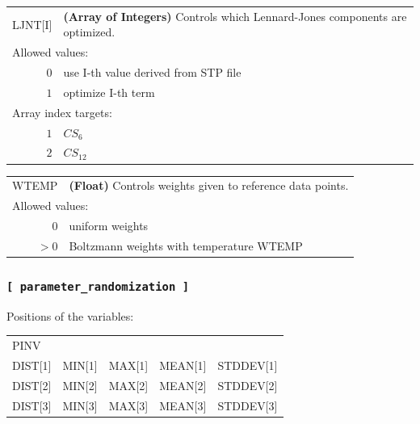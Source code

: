 \documentclass[10pt,a4paper,openany]{memoir}
\numberwithin{equation}{section}
\begin{document}
{
\begin{tabular}{r@{ : }l}
\label{descr:ljnt}
      LJNT[I]&\textbf{(Array of Integers)} Controls which Lennard-Jones components are optimized.                                               \\ 
\multicolumn{2}{l}{Allowed values:} \\ 
     \(0\)&use I-th value derived from STP file                                                                         \\ 
     \(1\)&optimize I-th term                                                                                   \\ 
\multicolumn{2}{l}{Array index targets:} \\ 
     \(1\)&$CS_6$                                                                                 \\ 
     \(2\)&$CS_{12}$                                                                            \\ 
\end{tabular}
\vspace{1ex}
}

{
\begin{tabular}{r@{ : }l}
\label{descr:wtemp}
     WTEMP&\textbf{(Float)} Controls weights given to reference data points.                                                     \\ 
\multicolumn{2}{l}{Allowed values:} \\ 
     \(0\)&uniform weights                                                                                      \\ 
    \(>0\)&Boltzmann weights with temperature WTEMP                                                             \\ 
\end{tabular}
\vspace{1ex}
}

\subsubsection{\texttt{[~parameter\_randomization~]}}
\label{sec:inp-parameter_randomization}

Positions of the variables:
\begin{center}
  \begin{tabular}{lllll}
    PINV&&&& \\
    DIST[1]&MIN[1]&MAX[1]&MEAN[1]&STDDEV[1] \\
    DIST[2]&MIN[2]&MAX[2]&MEAN[2]&STDDEV[2] \\
    DIST[3]&MIN[3]&MAX[3]&MEAN[3]&STDDEV[3] \\
  \end{tabular}
\end{center}
\end{document}
